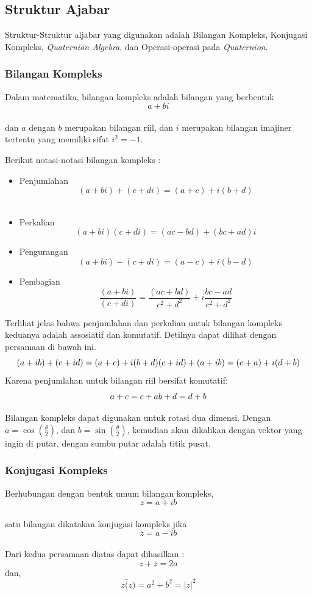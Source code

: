\subsection{Struktur Ajabar}
Struktur-Struktur aljabar yang digunakan adalah Bilangan Kompleks, Konjugasi Kompleks, \textit{Quaternion Algebra}, dan Operasi-operasi pada \textit{Quaternion}.

\subsubsection{Bilangan Kompleks}

Dalam matematika, bilangan kompleks adalah bilangan yang berbentuk\\
\[
	a+bi
\]\cite{kuipers:1999}\\
dan \(a\) dengan \(b\) merupakan bilangan riil, dan \(i\) merupakan bilangan imajiner tertentu yang memiliki sifat \(i^2=-1\).

Berikut notasi-notasi bilangan kompleks :
\begin{itemize}
	\item Penjumlahan\\
	\[
	 (a + bi) + (c + di) = (a+c) + i(b+d)
	\]\\
	\item Perkalian\\
	\[
	 (a + bi)(c + di) = (ac−bd) + (bc+ad)i
	\]
	\item Pengurangan\\
	\[
	 (a + bi) - (c + di) = (a-c) + i(b-d)
	\]
	\item Pembagian\\
	\[
	 \frac{(a + bi)}{(c + di)} = \frac{(ac+bd)}{c^2+d^2} + i \frac{bc-ad}{c^2+d^2}
	\]
\end{itemize}
Terlihat jelas bahwa penjumlahan dan perkalian untuk bilangan kompleks keduanya adalah assosiatif dan komutatif. Detilnya dapat dilihat dengan persamaan di bawah ini.
\[
	(a+ib) + (c+id) = (a+c) + i(b+d)\\
	(c+id) + (a+ib) = (c+a) + i(d+b)
\]
Karena penjumlahan untuk bilangan riil bersifat komutatif:
\[
	a+c = c+a\\
	b+d = d+b
\]

Bilangan kompleks dapat digunakan untuk rotasi dua dimensi. Dengan \(a = \cos (\frac{\theta}{2})\), dan \(b = \sin(\frac{\theta}{2})\), kemudian akan dikalikan dengan vektor yang ingin di putar, dengan sumbu putar adalah titik pusat.


\subsubsection{Konjugasi Kompleks}
\cite{kuipers:1999}Berhubungan dengan bentuk umum bilangan kompleks,
\[
	z = a + ib
\]\\
satu bilangan dikatakan konjugasi kompleks jika
\[
	\bar{z} = a - ib
\]\\
Dari kedua persamaan diatas dapat dihasilkan :
\[
	z + \bar{z} = 2a
\]dan,
\[
	z \bar(z) = a^2 +b^2 = |z|^2
\]

